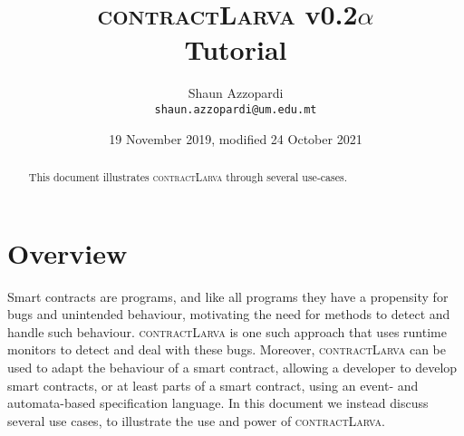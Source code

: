 \documentclass{article}
\newcommand{\contractlarva}{\textsc{contractLarva}\xspace}
\begin{document}
\title{\contractlarva v0.2$\alpha$\\Tutorial}
\author{Shaun Azzopardi\\\texttt{shaun.azzopardi@um.edu.mt}}
\date{19 November 2019, modified 24 October 2021}
\maketitle



\begin{abstract}
This document illustrates \contractlarva through several use-cases. %
\end{abstract}

\tableofcontents

 \section{Overview}
 
 Smart contracts are programs, and like all programs they have a propensity for bugs and unintended behaviour, motivating the need for methods to detect and handle such behaviour. \contractlarva is one such approach that uses runtime monitors to detect and deal with these bugs. Moreover, \contractlarva can be used to adapt the behaviour of a smart contract, allowing a developer to develop smart contracts, or at least parts of a smart contract, using an event- and automata-based specification language. In this document we instead discuss several use cases, to illustrate the use and power of \contractlarva. 
 
\end{document}
